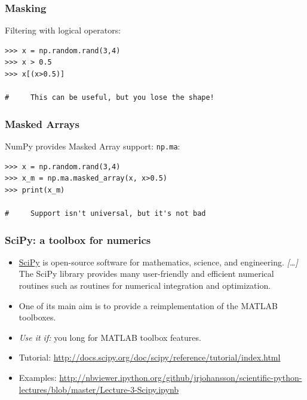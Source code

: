 \begin{frame}[fragile]\frametitle{Masking}

    Filtering with logical operators:
    \begin{lstlisting}
>>> x = np.random.rand(3,4)
>>> x > 0.5
>>> x[(x>0.5)]

#     This can be useful, but you lose the shape!
    \end{lstlisting}
\end{frame}

\begin{frame}[fragile]\frametitle{Masked Arrays}

    NumPy provides Masked Array support: \lstinline|np.ma|:
    \begin{lstlisting}
>>> x = np.random.rand(3,4)
>>> x_m = np.ma.masked_array(x, x>0.5)
>>> print(x_m)

#     Support isn't universal, but it's not bad
    \end{lstlisting}
\end{frame}


\begin{frame}[fragile]\frametitle{SciPy: a toolbox for numerics}

 \begin{itemize}
\item    \href{http://www.scipy.org}{SciPy} is open-source software for
  mathematics, science, and engineering. \emph{[\ldots]} The SciPy
  library provides many user-friendly and efficient numerical routines
  such as routines for numerical integration and optimization.

\item    One of its main aim is to provide a reimplementation of the
  MATLAB toolboxes.

\item     \emph{Use it if:} you long for MATLAB toolbox features.


  \item Tutorial: {\scriptsize\url{http://docs.scipy.org/doc/scipy/reference/tutorial/index.html}}
  \item Examples: {\scriptsize\url{http://nbviewer.ipython.org/github/jrjohansson/scientific-python-lectures/blob/master/Lecture-3-Scipy.ipynb}}
  \end{itemize}
\end{frame}

